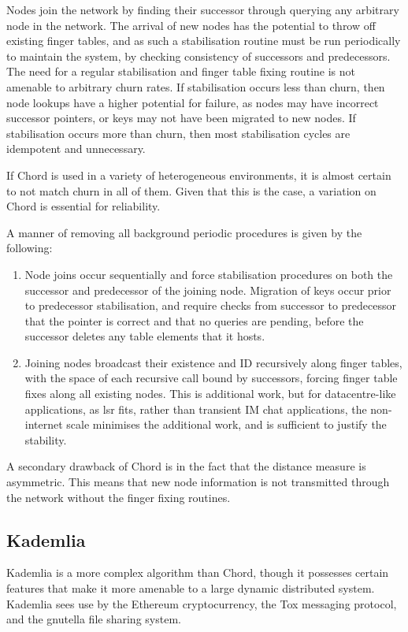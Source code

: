 \documentclass[10pt, a4paper]{article}
\begin{document}
Nodes join the network by finding their successor through querying any arbitrary node in the network.
The arrival of new nodes has the potential to throw off existing finger tables, and as such a stabilisation routine must be run periodically to maintain the system, by checking consistency of successors and predecessors.
The need for a regular stabilisation and finger table fixing routine is not amenable to arbitrary churn rates.
If stabilisation occurs less than churn, then node lookups have a higher potential for failure, as nodes may have incorrect successor pointers, or keys may not have been migrated to new nodes.
If stabilisation occurs more than churn, then most stabilisation cycles are idempotent and unnecessary.

If Chord is used in a variety of heterogeneous environments, it is almost certain to not match churn in all of them.
Given that this is the case, a variation on Chord is essential for reliability.

A manner of removing all background periodic procedures is given by the following:
\begin{enumerate}
	\item Node joins occur sequentially and force stabilisation procedures on both the successor and predecessor of the joining node.
		Migration of keys occur prior to predecessor stabilisation, and require checks from successor to predecessor that the pointer is correct and that no queries are pending, before the successor deletes any table elements that it hosts.
	\item Joining nodes broadcast their existence and ID recursively along finger tables, with the space of each recursive call bound by successors, forcing finger table fixes along all existing nodes.
		This is additional work, but for datacentre-like applications, as lsr{} fits, rather than transient IM chat applications, the non-internet scale minimises the additional work, and is sufficient to justify the stability.
\end{enumerate}

A secondary drawback of Chord is in the fact that the distance measure is asymmetric.
This means that new node information is not transmitted through the network without the finger fixing routines.

\subsection{Kademlia}

Kademlia is a more complex algorithm than Chord, though it possesses certain features that make it more amenable to a large dynamic distributed system.
Kademlia sees use by the Ethereum cryptocurrency, the Tox messaging protocol, and the gnutella file sharing system.
\end{document}
